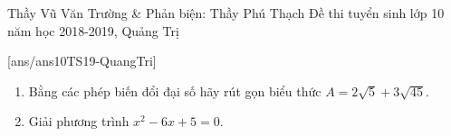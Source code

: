 \begin{name}
{Thầy Vũ Văn Trường \& Phản biện: Thầy Phú Thạch}
{Đề thi tuyển sinh lớp 10 năm học 2018-2019, Quảng Trị}
\end{name}
\setcounter{ex}{0}
[ans/ans10TS19-QuangTri]
\begin{ex}%
\begin{enumerate}
  \item Bằng các phép biến đổi đại số hãy rút gọn biểu thức $A=2\sqrt{5}+3\sqrt{45}$.
  \item Giải phương trình $x^2-6x+5=0$.
\end{enumerate}
\end{ex}

